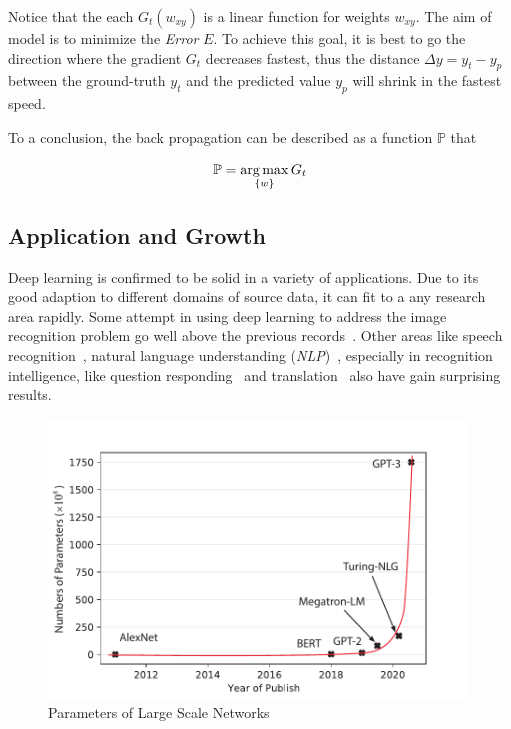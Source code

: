 \begin{spacing}{1.5}
Notice that the each $G_t(w_{xy})$ is a linear function for weights $w_{xy}$. The aim of model is to minimize the \textit{Error} $E$. To achieve this goal, it is best to go the direction where the gradient $G_t$ decreases fastest, thus the distance $\Delta y=y_t-y_p$ between the ground-truth $y_t$ and the predicted value $y_p$ will shrink in the fastest speed.

To a conclusion, the back propagation can be described as a function $\mathbb{P}$ that

\begin{equation}
    \mathbb{P}=\operatorname*{arg\,max}_{\{w\}}G_t
\end{equation}

\subsection{Application and Growth}

Deep learning is confirmed to be solid in a variety of applications. Due to its good adaption to different domains of source data, it can fit to a any research area rapidly. Some attempt in using deep learning to address the image recognition problem go well above the previous records~\cite{krizhevsky2012imagenet, farabet2012learning, tompson2014joint, szegedy2015going}. Other areas like speech recognition~\cite{mikolov2011strategies, hinton2012deep, sainath2013deep}, natural language understanding (\textit{NLP})~\cite{collobert2011natural}, especially in recognition intelligence, like question responding~\cite{bordes2014question} and translation~\cite{jean2014using, sutskever2014sequence} also have gain surprising results. 

\begin{figure}[ht]
\centering
\includegraphics[width=0.99\textwidth, fbox]{Chapter2/paramnum.pdf}
\caption{Parameters of Large Scale Networks}
\label{fig:paramnum} 
\end{figure}


\end{spacing}

